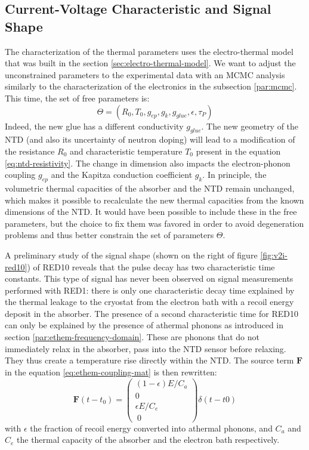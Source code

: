 \subsection{Current-Voltage Characteristic and Signal Shape}

The characterization of the thermal parameters uses the electro-thermal model that was built in the section \ref{sec:electro-thermal-model}. We want to adjust the unconstrained parameters to the experimental data with an MCMC analysis similarly to the characterization of the electronics in the subsection \ref{par:mcmc}. This time, the set of free parameters is:
\begin{equation}
\Theta = (R_0, T_0, g_{ep}, g_k, g_{glue}, \epsilon, \tau_P)
\label{theta-red10}
\end{equation}
Indeed, the new glue has a different conductivity $g_{glue}$. The new geometry of the NTD (and also its uncertainty of neutron doping) will lead to a modification of the resistance $R_0$ and characteristic temperature $T_0$ present in the equation \ref{eq:ntd-resistivity}. The change in dimension also impacts the electron-phonon coupling $g_{ep}$ and the Kapitza conduction coefficient $g_k$. In principle, the volumetric thermal capacities of the absorber and the NTD remain unchanged, which makes it possible to recalculate the new thermal capacities from the known dimensions of the NTD. It would have been possible to include these in the free parameters, but the choice to fix them was favored in order to avoid degeneration problems and thus better constrain the set of parameters $\Theta$.

A preliminary study of the signal shape (shown on the right of figure \ref{fig:v2i-red10}) of RED10 reveals that the pulse decay has two characteristic time constants. This type of signal has never been observed on signal measurements performed with RED1: there is only one characteristic decay time explained by the thermal leakage to the cryostat from the electron bath with a recoil energy deposit in the absorber. The presence of a second characteristic time for RED10 can only be explained by the presence of athermal phonons as introduced in section \ref{par:ethem-frequency-domain}. These are phonons that do not immediately relax in the absorber, pass into the NTD sensor before relaxing. They thus create a temperature rise directly within the NTD. The source term $\bm{F}$ in the equation \ref{eq:ethem-coupling-mat} is then rewritten:
\begin{equation}
\label{eq:source-athermal}
\bm{F}(t-t_0) = 
\left( \begin{array}{c}
(1-\epsilon)E/C_a \\
0 \\
\epsilon E/C_e \\\
0
\end{array} \right) \delta (t-t0)
\end{equation}
with $\epsilon$ the fraction of recoil energy converted into athermal phonons, and $C_a$ and $C_e$ the thermal capacity of the absorber and the electron bath respectively.

